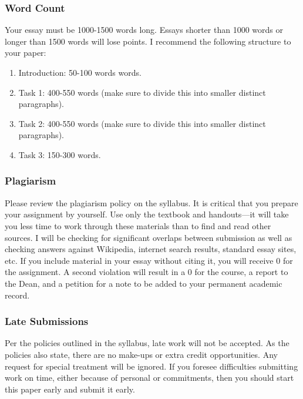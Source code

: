 \documentclass[]{article}
\providecommand{\tightlist}{%
  \setlength{\itemsep}{0pt}\setlength{\parskip}{0pt}}
\begin{document}
\subsubsection{Word Count}\label{word-count}

Your essay must be 1000-1500 words long. Essays shorter than 1000 words
or longer than 1500 words will lose points. I recommend the following
structure to your paper:

\begin{enumerate}
\def\labelenumi{\arabic{enumi}.}
\tightlist
\item
  Introduction: 50-100 words words.
\item
  Task 1: 400-550 words (make sure to divide this into smaller distinct
  paragraphs).
\item
  Task 2: 400-550 words (make sure to divide this into smaller distinct
  paragraphs).
\item
  Task 3: 150-300 words.
\end{enumerate}

\subsubsection{Plagiarism}\label{plagiarism}

Please review the plagiarism policy on the syllabus. It is critical that
you prepare your assignment by yourself. Use only the textbook and
handouts---it will take you less time to work through these materials
than to find and read other sources. I will be checking for significant
overlaps between submission as well as checking answers against
Wikipedia, internet search results, standard essay sites, etc. If you
include material in your essay without citing it, you will receive 0 for
the assignment. A second violation will result in a 0 for the course, a
report to the Dean, and a petition for a note to be added to your
permanent academic record.

\subsubsection{Late Submissions}\label{late-submissions}

Per the policies outlined in the syllabus, late work will not be
accepted. As the policies also state, there are no make-ups or extra
credit opportunities. Any request for special treatment will be ignored.
If you foresee difficulties submitting work on time, either because of
personal or commitments, then you should start this paper early and
submit it early.
\end{document}
